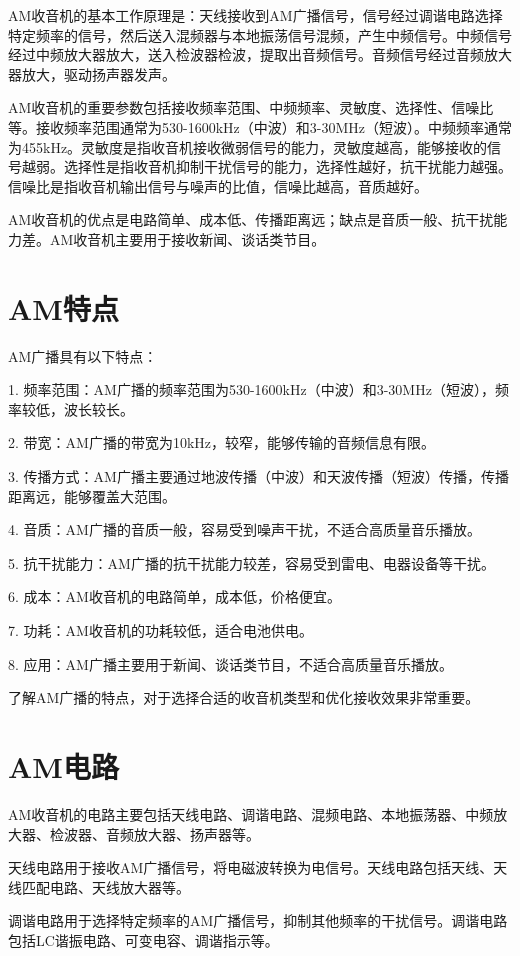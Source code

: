\documentclass[12pt,UTF8]{ctexbook}
\begin{document}
AM收音机的基本工作原理是：天线接收到AM广播信号，信号经过调谐电路选择特定频率的信号，然后送入混频器与本地振荡信号混频，产生中频信号。中频信号经过中频放大器放大，送入检波器检波，提取出音频信号。音频信号经过音频放大器放大，驱动扬声器发声。

AM收音机的重要参数包括接收频率范围、中频频率、灵敏度、选择性、信噪比等。接收频率范围通常为530-1600kHz（中波）和3-30MHz（短波）。中频频率通常为455kHz。灵敏度是指收音机接收微弱信号的能力，灵敏度越高，能够接收的信号越弱。选择性是指收音机抑制干扰信号的能力，选择性越好，抗干扰能力越强。信噪比是指收音机输出信号与噪声的比值，信噪比越高，音质越好。

AM收音机的优点是电路简单、成本低、传播距离远；缺点是音质一般、抗干扰能力差。AM收音机主要用于接收新闻、谈话类节目。

\section{AM特点}

AM广播具有以下特点：

1. 频率范围：AM广播的频率范围为530-1600kHz（中波）和3-30MHz（短波），频率较低，波长较长。

2. 带宽：AM广播的带宽为10kHz，较窄，能够传输的音频信息有限。

3. 传播方式：AM广播主要通过地波传播（中波）和天波传播（短波）传播，传播距离远，能够覆盖大范围。

4. 音质：AM广播的音质一般，容易受到噪声干扰，不适合高质量音乐播放。

5. 抗干扰能力：AM广播的抗干扰能力较差，容易受到雷电、电器设备等干扰。

6. 成本：AM收音机的电路简单，成本低，价格便宜。

7. 功耗：AM收音机的功耗较低，适合电池供电。

8. 应用：AM广播主要用于新闻、谈话类节目，不适合高质量音乐播放。

了解AM广播的特点，对于选择合适的收音机类型和优化接收效果非常重要。

\section{AM电路}

AM收音机的电路主要包括天线电路、调谐电路、混频电路、本地振荡器、中频放大器、检波器、音频放大器、扬声器等。

天线电路用于接收AM广播信号，将电磁波转换为电信号。天线电路包括天线、天线匹配电路、天线放大器等。

调谐电路用于选择特定频率的AM广播信号，抑制其他频率的干扰信号。调谐电路包括LC谐振电路、可变电容、调谐指示等。
\end{document}

